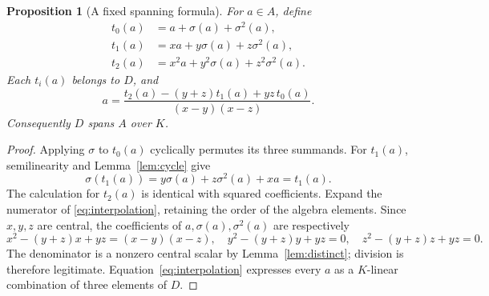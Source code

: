 \documentclass[11pt,letterpaper]{article}
\newtheorem{proposition}[theorem]{Proposition}
\theoremstyle{definition}
\theoremstyle{remark}
\begin{document}
\begin{proposition}[A fixed spanning formula]\label{prop:span}
For $a\in A$, define
\begin{align*}
t_0(a)&=a+\sigma(a)+\sigma^2(a),\\
t_1(a)&=xa+y\sigma(a)+z\sigma^2(a),\\
t_2(a)&=x^2a+y^2\sigma(a)+z^2\sigma^2(a).
\end{align*}
Each $t_i(a)$ belongs to $D$, and
\begin{equation}\label{eq:interpolation}
a=\frac{t_2(a)-(y+z)t_1(a)+yz\,t_0(a)}{(x-y)(x-z)}.
\end{equation}
Consequently $D$ spans $A$ over $K$.
\end{proposition}
\begin{proof}
Applying $\sigma$ to $t_0(a)$ cyclically permutes its three summands.
For $t_1(a)$, semilinearity and Lemma~\ref{lem:cycle} give
\[
\sigma(t_1(a))=y\sigma(a)+z\sigma^2(a)+xa=t_1(a).
\]
The calculation for $t_2(a)$ is identical with squared coefficients.
Expand the numerator of \eqref{eq:interpolation}, retaining the order of
the algebra elements. Since $x,y,z$ are central, the coefficients of
$a,\sigma(a),\sigma^2(a)$ are respectively
\[
x^2-(y+z)x+yz=(x-y)(x-z),\quad
y^2-(y+z)y+yz=0,\quad
z^2-(y+z)z+yz=0.
\]
The denominator is a nonzero central scalar by
Lemma~\ref{lem:distinct}; division is therefore legitimate.
Equation~\eqref{eq:interpolation} expresses every $a$ as a $K$-linear
combination of three elements of $D$.
\end{proof}
\end{document}
